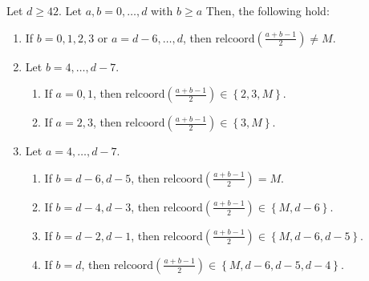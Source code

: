 \begin{proposition}
    Let \( d \geq 42 \). Let \( a,b  = 0, \dots, d \) with \( b \geq a \) Then, the following hold:
    \begin{enumerate}
        \item If \( b = 0, 1,2,3 \) or \( a = d-6, \dots, d \), then \( \mathrm{relcoord}( \frac{a + b - 1}{2}) \neq M \).
        \item Let \( b = 4, \dots, d-7 \).
        \begin{enumerate}
            \item If \( a = 0,1 \), then \( \mathrm{relcoord}( \frac{a + b - 1}{2}) \in \left\{ 2,3, M \right\} \).
            \item If \( a = 2,3 \), then \( \mathrm{relcoord}( \frac{a + b - 1}{2}) \in \left\{ 3, M \right\} \).
        \end{enumerate}
        \item Let \( a = 4, \dots, d-7 \).
        \begin{enumerate}
            \item If \( b = d-6, d-5 \), then \( \mathrm{relcoord}( \frac{a + b - 1}{2}) = M \).
            \item If \( b = d-4,d-3 \), then \( \mathrm{relcoord}( \frac{a + b - 1}{2}) \in \left\{ M, d-6 \right\} \).
            \item If \( b = d-2,d-1 \), then \( \mathrm{relcoord}( \frac{a + b - 1}{2}) \in \left\{ M, d-6,d-5 \right\} \).
            \item If \( b = d \), then \( \mathrm{relcoord}( \frac{a + b - 1}{2}) \in \left\{ M, d-6,d-5,d-4 \right\} \).
        \end{enumerate}
    \end{enumerate}
\end{proposition}

